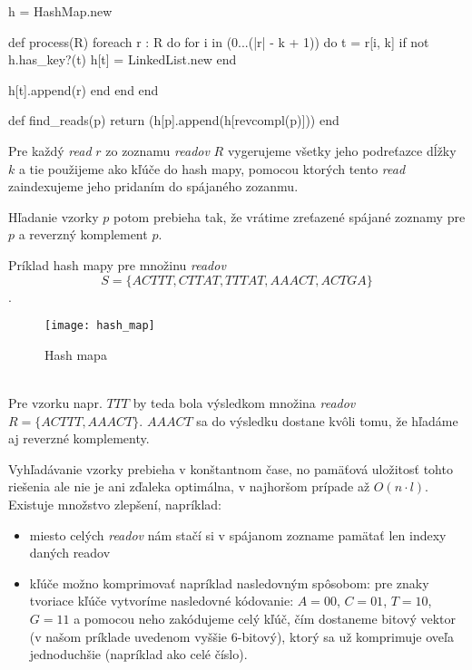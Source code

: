 \begin{pseudocode}[label=lst:hash_algorithm,caption={Algoritmus na riešenie
problému zarovnania readov pomocou hash mapy}]
h = HashMap.new

def process(R)
  foreach r : R do
    for i in (0...(|r| - k + 1)) do
      t = r[i, k]
      if not h.has_key?(t)
        h[t] = LinkedList.new
      end
        
      h[t].append(r)
    end 
  end
end

def find_reads(p)
  return (h[p].append(h[revcompl(p)]))
end
\end{pseudocode}

Pre každý \emph{read} $r$ zo zoznamu \emph{readov} $R$ vygerujeme všetky jeho
podreťazce dĺžky $k$ a tie použijeme ako kľúče do hash mapy, pomocou ktorých
tento \emph{read} zaindexujeme jeho pridaním do spájaného zozanmu.

Hľadanie vzorky $p$ potom prebieha tak, že vrátime zreťazené spájané
zoznamy pre $p$ a reverzný komplement $p$.

\begin{example}
    Príklad hash mapy pre množinu \emph{readov} $$S = \{ACTTT, CTTAT, TTTAT,
    AAACT, ACTGA\}$$.
    \begin{figure}[h]
        \centering
        \texttt{[image: hash\_map]}
        \caption{Hash mapa}
        \label{fig:hash_map}
    \end{figure}
    \\
    Pre vzorku napr. $TTT$ by teda bola výsledkom množina \emph{readov} $R =
    \{ACTTT, AAACT\}$. $AAACT$ sa do výsledku dostane kvôli tomu, že hľadáme aj reverzné komplementy.
\end{example}

Vyhľadávanie vzorky prebieha v konštantnom čase, no pamäťová uložitosť tohto
riešenia ale nie je ani zďaleka optimálna, v najhoršom prípade až $O(n \cdot
l)$. Existuje množstvo zlepšení, napríklad:

\begin{itemize}
    \item miesto celých \emph{readov} nám stačí si v spájanom zozname
    pamätať len indexy daných readov
    \item kľúče možno komprimovať napríklad nasledovným spôsobom: pre znaky
    tvoriace kľúče vytvoríme nasledovné kódovanie: $A = 00$, $C = 01$, $T = 10$,
    $G = 11$ a pomocou neho zakódujeme celý kľúč, čím dostaneme bitový vektor
    (v našom príklade uvedenom vyššie 6-bitový), ktorý sa už komprimuje oveľa
    jednoduchšie (napríklad ako celé číslo).
\end{itemize}

